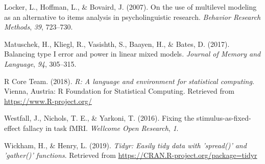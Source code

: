 \documentclass[doc,floatsintext]{apa6}
\begin{document}
\leavevmode\hypertarget{ref-locker_hoffman_bovaird_2007}{}%
Locker, L., Hoffman, L., \& Bovaird, J. (2007). On the use of multilevel modeling as an alternative to items analysis in psycholinguistic research. \emph{Behavior Research Methods}, \emph{39}, 723--730.

\leavevmode\hypertarget{ref-matuschek_et_al_2017}{}%
Matuschek, H., Kliegl, R., Vasishth, S., Baayen, H., \& Bates, D. (2017). Balancing type I error and power in linear mixed models. \emph{Journal of Memory and Language}, \emph{94}, 305--315.

\leavevmode\hypertarget{ref-R-base}{}%
R Core Team. (2018). \emph{R: A language and environment for statistical computing}. Vienna, Austria: R Foundation for Statistical Computing. Retrieved from \url{https://www.R-project.org/}

\leavevmode\hypertarget{ref-westfall_yarkoni_2016}{}%
Westfall, J., Nichols, T. E., \& Yarkoni, T. (2016). Fixing the stimulus-as-fixed-effect fallacy in task fMRI. \emph{Wellcome Open Research}, \emph{1}.

\leavevmode\hypertarget{ref-R-tidyr}{}%
Wickham, H., \& Henry, L. (2019). \emph{Tidyr: Easily tidy data with 'spread()' and 'gather()' functions}. Retrieved from \url{https://CRAN.R-project.org/package=tidyr}

\endgroup
\end{document}
